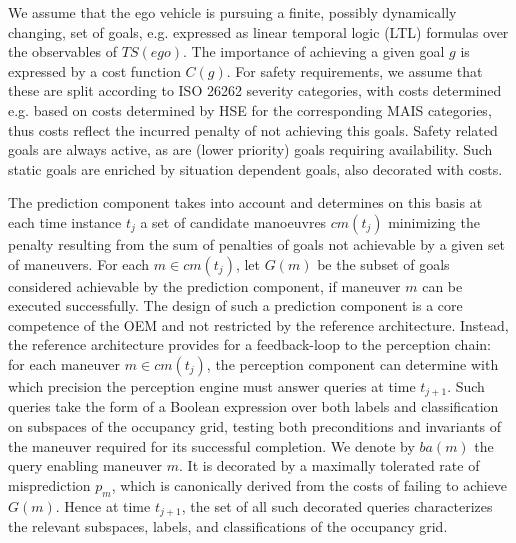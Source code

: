 We assume that the ego vehicle is pursuing a finite, possibly dynamically changing, set of goals, e.g. expressed as linear temporal logic (LTL) formulas over the observables of $TS(ego)$. The importance of achieving a given goal $g$ is expressed by a cost function $C(g)$. For safety requirements, we assume that these are split according to ISO 26262 severity categories, with costs determined e.g. based on costs determined by HSE for the corresponding MAIS categories, thus costs reflect the incurred penalty of not achieving this goals. Safety related goals are always active, as are (lower priority) goals requiring availability. Such static goals are enriched by situation dependent goals, also decorated with costs.

The prediction component takes into account
and determines on this basis at each time instance $t_j$ a set of candidate manoeuvres $cm(t_j)$  minimizing the penalty resulting from the sum of penalties of goals not achievable by a given set of maneuvers. For each $m\in cm(t_j)$, let $G(m)$ be the subset of goals considered achievable by the prediction component, if maneuver $m$ can be executed successfully. The design of such a prediction component is a core competence of the OEM and not restricted by the reference architecture. Instead, the reference architecture provides for a feedback-loop to the perception chain: for each maneuver $m\in cm(t_j)$, the perception component can determine with which precision the perception engine must answer queries at time $t_{j+1}$. Such queries take the form of a Boolean expression over both labels and classification on subspaces of the occupancy grid, testing both preconditions and invariants of the maneuver required for its successful completion. We denote by $ba(m)$ the query enabling maneuver $m$. It is decorated by a maximally tolerated rate of misprediction $p_m$, which is canonically derived from the costs of failing to achieve $G(m)$. Hence at time $t_{j+1}$, the set of all such decorated queries characterizes the relevant subspaces, labels, and classifications of the occupancy grid. 

